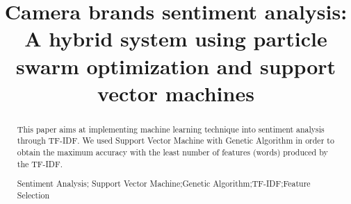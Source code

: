 \documentclass[runningheads,a4paper]{llncs}
\newcommand{\keywords}[1]{\par\addvspace\baselineskip
\noindent\keywordname\enspace\ignorespaces#1}
\begin{document}
\mainmatter  %

\title{ Camera brands sentiment analysis: A hybrid system using particle swarm optimization and support vector machines }


%
%
%

%
%

\maketitle


\begin{abstract}

This paper aims at implementing machine learning technique into sentiment analysis through TF-IDF. We used Support Vector Machine with Genetic Algorithm in order to obtain the maximum accuracy with the least number of features (words) produced by the TF-IDF.


\keywords{Sentiment Analysis; Support Vector Machine;Genetic Algorithm;TF-IDF;Feature Selection}
\end{abstract}
\end{document}
